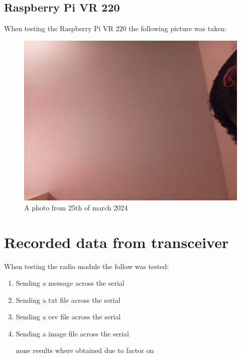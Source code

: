 \subsection{Raspberry Pi VR 220}
When testing  the Raspberry Pi VR 220 the following picture was taken:
\begin{figure}[h!]
    \centering
    \includegraphics[width=0.4\linewidth]{Images/camera_output_2024-03-21_21-43-16.png}
    \caption{A photo from 25th of march 2024 }
    \label{A photo from 25th of march 2024}
\end{figure}

\section{Recorded data from transceiver}
When testing  the radio module the follow was tested:
\begin{enumerate}
    \item Sending a message across the serial

    \item Sending a txt file across the serial

    \item Sending a csv file across the serial


    \item Sending a image file across the serial

    none results where obtained due to  factor on \pageref{Discussion of Lora module}
\end{enumerate}
